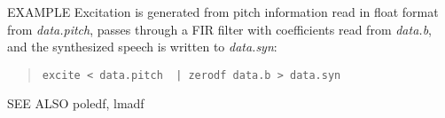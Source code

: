 \begin{options}
\end{options}

\begin{qsection}{EXAMPLE}
Excitation is generated from pitch information read in float format
from {\em data.pitch}, passes through a FIR filter with
coefficients read from {\em data.b},
and the synthesized speech is written to {\em data.syn}:
\begin{quote}
  \verb!excite < data.pitch  | zerodf data.b > data.syn!
\end{quote}
\end{qsection}

\begin{qsection}{SEE ALSO}
  poledf, lmadf
\end{qsection}
